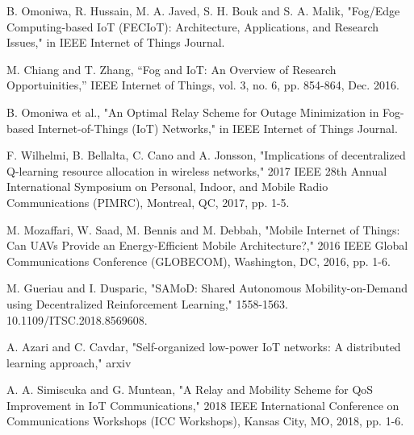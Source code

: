 \documentclass[journal]{IEEEtran}
\begin{document}

%
%
%
\begin{thebibliography}{1}
B. Omoniwa, R. Hussain, M. A. Javed, S. H. Bouk and S. A. Malik, "Fog/Edge Computing-based IoT (FECIoT): Architecture, Applications, and Research Issues," in IEEE Internet of Things Journal.

M. Chiang and T. Zhang, ``Fog and IoT: An Overview of Research Opportuinities,'' IEEE Internet of Things, vol. 3, no. 6, pp. 854-864, Dec.
2016.

B. Omoniwa et al., "An Optimal Relay Scheme for Outage Minimization in Fog-based Internet-of-Things (IoT) Networks," in IEEE Internet of Things Journal.


F. Wilhelmi, B. Bellalta, C. Cano and A. Jonsson, "Implications of decentralized Q-learning resource allocation in wireless networks," 2017 IEEE 28th Annual International Symposium on Personal, Indoor, and Mobile Radio Communications (PIMRC), Montreal, QC, 2017, pp. 1-5.

M. Mozaffari, W. Saad, M. Bennis and M. Debbah, "Mobile Internet of Things: Can UAVs Provide an Energy-Efficient Mobile Architecture?," 2016 IEEE Global Communications Conference (GLOBECOM), Washington, DC, 2016, pp. 1-6.

M. Gueriau and I. Dusparic, "SAMoD: Shared Autonomous Mobility-on-Demand using Decentralized Reinforcement Learning,"  1558-1563. 10.1109/ITSC.2018.8569608.

A. Azari and C. Cavdar, "Self-organized low-power IoT networks: A distributed learning approach," arxiv

A. A. Simiscuka and G. Muntean, "A Relay and Mobility Scheme for QoS Improvement in IoT Communications," 2018 IEEE International Conference on Communications Workshops (ICC Workshops), Kansas City, MO, 2018, pp. 1-6.


\end{thebibliography}
\end{document}

